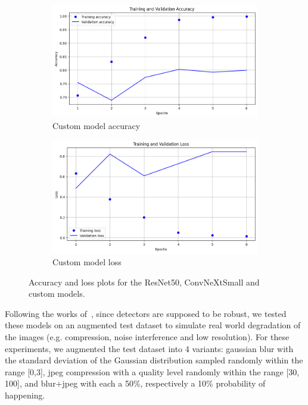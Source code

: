 \documentclass[runningheads]{llncs}
\begin{document}
\begin{figure}[htbp]
    \begin{subfigure}[b]{0.45\textwidth}
        \includegraphics[width=\textwidth]{graphics/accuracy_custom.png}
        \caption{Custom model accuracy}
        \label{fig:graph5}
    \end{subfigure}
    \hfill
    \begin{subfigure}[b]{0.45\textwidth}
        \includegraphics[width=\textwidth]{graphics/loss_custom.png}
        \caption{Custom model loss}
        \label{fig:graph6}
    \end{subfigure}

    \caption{Accuracy and loss plots for the ResNet50, ConvNeXtSmall and custom models.}
    \label{fig:sixgraphs}
\end{figure}


Following the works of~\cite{wang2019cnngenerated}, since detectors are supposed to be robust, we tested these models on an augmented test dataset to simulate real world degradation of the images (e.g. compression, noise interference and low resolution). For these experiments, we augmented the test dataset into 4 variants: gaussian blur with the standard deviation of the Gaussian distribution sampled randomly within the range [0,3], jpeg compression with a quality level randomly within the range [30, 100], and blur+jpeg with each a 50\%, respectively a 10\% probability of happening.
\end{document}
